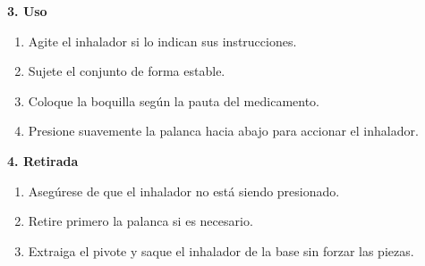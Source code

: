 \documentclass[11pt,a4paper]{article}
\begin{document}
\vspace{0.4cm}

\noindent
\begin{minipage}{0.48\textwidth}
\setlength{\fboxsep}{9pt}
\colorbox{ArthroTeal!8}{
\begin{minipage}{0.92\textwidth}

{\large\bfseries\color{ArthroNavy} 3. Uso}

\vspace{0.2cm}

\begin{enumerate}
    \item Agite el inhalador si lo indican sus instrucciones.
    \item Sujete el conjunto de forma estable.
    \item Coloque la boquilla según la pauta del medicamento.
    \item Presione suavemente la palanca hacia abajo para accionar el inhalador.
\end{enumerate}

\end{minipage}
}
\end{minipage}
\hfill
\begin{minipage}{0.48\textwidth}
\setlength{\fboxsep}{9pt}
\colorbox{ArthroTeal!8}{
\begin{minipage}{0.92\textwidth}

{\large\bfseries\color{ArthroNavy} 4. Retirada}

\vspace{0.2cm}

\begin{enumerate}
    \item Asegúrese de que el inhalador no está siendo presionado.
    \item Retire primero la palanca si es necesario.
    \item Extraiga el pivote y saque el inhalador de la base sin forzar las piezas.
\end{enumerate}

\end{minipage}
}
\end{minipage}

\vspace{0.45cm}
\end{document}
